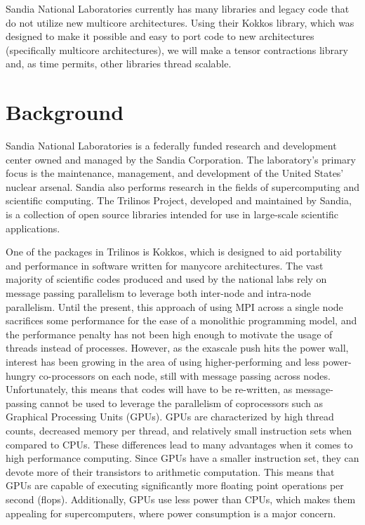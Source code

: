 \documentclass[proposal]{hmcclinic}
\begin{document}
Sandia National Laboratories currently has many libraries and legacy code that
do not utilize new multicore architectures. Using their Kokkos library, which
was designed to make it possible and easy to port code to new architectures
(specifically multicore architectures), we will make a tensor contractions
library and, as time permits, other libraries thread scalable.

\section{Background}

Sandia National Laboratories is a federally funded research and development
center owned and managed by the Sandia Corporation.  The laboratory's primary
focus is the maintenance, management, and development of the United States'
nuclear arsenal.  Sandia also performs research in the fields of supercomputing
and scientific computing.  The Trilinos Project, developed and maintained by
Sandia, is a collection of open source libraries intended for use in large-scale
scientific applications.

One of the packages in Trilinos is Kokkos, which is designed to aid portability
and performance in software written for manycore architectures.  The vast
majority of scientific codes produced and used by the national labs rely on
message passing parallelism to leverage both inter-node and intra-node
parallelism.  Until the present, this approach of using MPI across a single node
sacrifices some performance for the ease of a monolithic programming model, and
the performance penalty has not been high enough to motivate the usage of
threads instead of processes.  However, as the exascale push hits the power
wall, interest has been growing in the area of using higher-performing and less
power-hungry co-processors on each node, still with message passing across
nodes.  Unfortunately, this means that codes will have to be re-written, as
message-passing cannot be used to leverage the parallelism of coprocessors such
as Graphical Processing Units (GPUs). GPUs are characterized by high thread
counts, decreased memory per thread, and relatively small instruction sets when
compared to CPUs. These differences lead to many advantages when it comes to
high performance computing. Since GPUs have a smaller instruction set, they can
devote more of their transistors to arithmetic computation. This means that GPUs
are capable of executing significantly more floating point operations per second
(flops). Additionally, GPUs use less power than CPUs, which makes them appealing
for supercomputers, where power consumption is a major concern.
\end{document}
